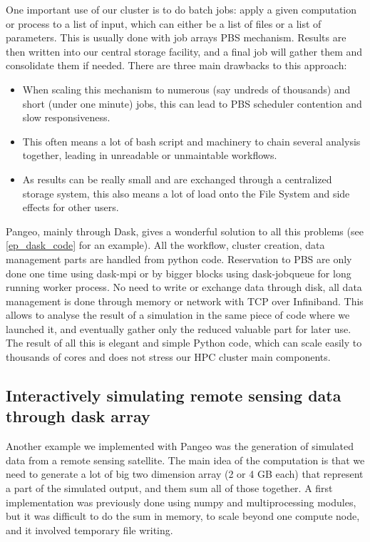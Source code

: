 \documentclass{article}
\begin{document}
One important use of our cluster is to do batch jobs: apply a given computation or process to a list of input, which can either be a list of files or a list of parameters. This is usually done with job arrays PBS mechanism. Results are then written into our central storage facility, and a final job will gather them and consolidate them if needed. There are three main drawbacks to this approach:
\begin{itemize}
\item When scaling this mechanism to numerous (say undreds of thousands) and short (under one minute) jobs, this can lead to PBS scheduler contention and slow responsiveness.
\item This often means a lot of bash script and machinery to chain several analysis together, leading in unreadable or unmaintable workflows.
\item As results can be really small and are exchanged through a centralized storage system, this also means a lot of load onto the File System and side effects for other users.
\end{itemize}

Pangeo, mainly through Dask, gives a wonderful solution to all this problems (see \ref{ep_dask_code} for an example). All the workflow, cluster creation, data management parts are handled from python code. Reservation to PBS are only done one time using dask-mpi or by bigger blocks using dask-jobqueue for long running worker process. No need to write or exchange data through disk, all data management is done through memory or network with TCP over Infiniband. This allows to analyse the result of a simulation in the same piece of code where we launched it, and eventually gather only the reduced valuable part for later use. The result of all this is elegant and simple Python code, which can scale easily to thousands of cores and does not stress our HPC cluster main components.

\subsection{Interactively simulating remote sensing data through dask array}
\label{ssec:usecase2}

Another example we implemented with Pangeo was the generation of simulated data from a remote sensing satellite. The main idea of the computation is that we need to generate a lot of big two dimension array (2 or 4 GB each) that represent a part of the simulated output, and them sum all of those together. A first implementation was previously done using numpy and multiprocessing modules, but it was difficult to do the sum in memory, to scale beyond one compute node, and it involved temporary file writing.
\end{document}
